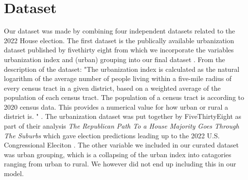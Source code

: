 \documentclass[12pt]{article}
\newcommand{\red}[1]{\textcolor{red}{#1}}
\newcommand{\blue}[1]{\textcolor{blue}{#1}}
\begin{document}







\section{Dataset}
Our dataset was made by combining four independent datasets related to the 2022 House election. The first dataset is the publically available urbanization dataset published by fivethirty eight from which we incorporate the variables urbanization index  and (urban) grouping into our final dataset \cite{urbanizationdataset}. From the description of the dataset: "The urbanization index is calculated as the natural logarithm of the average number of people living within a five-mile radius of every census tract in a given district, based on a weighted average of the population of each census tract. The population of a census tract is according to 2020 census data. This provides a numerical value for how urban or rural a district is. " \cite{urbanizationdataset}. The urbanization dataset was put together by FiveThirtyEight as part of their analysis  \textit{The Republican Path To a House Majority Goes Through The Suburbs} which gave election predictions leading up to the 2022 U.S. Congressional Eleciton \cite{538urbanizationarticle}. The other variable we included in our curated dataset was urban grouping, which is a collapsing of the urban index into catagories ranging from urban to rural. We however did not end up including this in our model.
\end{document}
